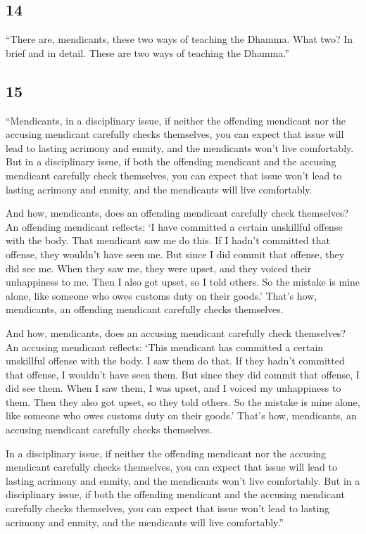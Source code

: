 \documentclass[12pt,openany]{book}%
\begin{document}
\subsection*{14 }

“There are, mendicants, these two ways of teaching the Dhamma. What two? In brief and in detail. These are two ways of teaching the Dhamma.” 

\subsection*{15 }

“Mendicants, in a disciplinary issue, if neither the offending mendicant nor the accusing mendicant carefully checks themselves, you can expect that issue will lead to lasting acrimony and enmity, and the mendicants won’t live comfortably. But in a disciplinary issue, if both the offending mendicant and the accusing mendicant carefully check themselves, you can expect that issue won’t lead to lasting acrimony and enmity, and the mendicants will live comfortably. 

And how, mendicants, does an offending mendicant carefully check themselves? An offending mendicant reflects: ‘I have committed a certain unskillful offense with the body. That mendicant saw me do this. If I hadn’t committed that offense, they wouldn’t have seen me. But since I did commit that offense, they did see me. When they saw me, they were upset, and they voiced their unhappiness to me. Then I also got upset, so I told others. So the mistake is mine alone, like someone who owes customs duty on their goods.’ That’s how, mendicants, an offending mendicant carefully checks themselves. 

And how, mendicants, does an accusing mendicant carefully check themselves? An accusing mendicant reflects: ‘This mendicant has committed a certain unskillful offense with the body. I saw them do that. If they hadn’t committed that offense, I wouldn’t have seen them. But since they did commit that offense, I did see them. When I saw them, I was upset, and I voiced my unhappiness to them. Then they also got upset, so they told others. So the mistake is mine alone, like someone who owes customs duty on their goods.’ That’s how, mendicants, an accusing mendicant carefully checks themselves. 

In a disciplinary issue, if neither the offending mendicant nor the accusing mendicant carefully checks themselves, you can expect that issue will lead to lasting acrimony and enmity, and the mendicants won’t live comfortably. But in a disciplinary issue, if both the offending mendicant and the accusing mendicant carefully checks themselves, you can expect that issue won’t lead to lasting acrimony and enmity, and the mendicants will live comfortably.” 
\end{document}
